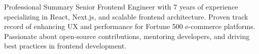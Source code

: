 \documentclass{resume} %
\begin{document}
\begin{rSection}{Professional Summary}
Senior Frontend Engineer with 7 years of experience specializing in React, Next.js, and scalable frontend architecture. Proven track record of enhancing UX and performance for Fortune 500 e-commerce platforms. Passionate about open-source contributions, mentoring developers, and driving best practices in frontend development.
\end{rSection}



\end{document}
